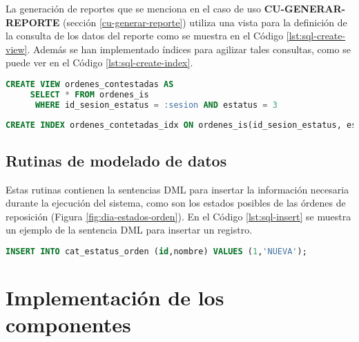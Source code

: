 La generación de reportes que se menciona en el caso de uso \textbf{CU-GENERAR-REPORTE} (sección \ref{cu-generar-reporte}) utiliza una vista para la definición de la consulta de los datos del reporte como se muestra en el Código \ref{lst:sql-create-view}. Además se han implementado índices para agilizar tales consultas, como se puede ver en el Código \ref{lst:sql-create-index}.

\begin{lstlisting}[language=SQL, caption={Sentencia para crear una vista.}, captionpos=b, label={lst:sql-create-view}]
CREATE VIEW ordenes_contestadas AS
     SELECT * FROM ordenes_is
      WHERE id_sesion_estatus = :sesion AND estatus = 3
\end{lstlisting}

\begin{lstlisting}[language=SQL, caption={Sentencia para crear un índice.}, captionpos=b, label={lst:sql-create-index}]
CREATE INDEX ordenes_contetadas_idx ON ordenes_is(id_sesion_estatus, estatus);
\end{lstlisting}

\subsection{Rutinas de modelado de datos}
Estas rutinas contienen la sentencias DML para insertar la información necesaria durante la ejecución del sistema, como son los estados posibles de las órdenes de reposición (Figura \ref{fig:dia-estados-orden}). En el Código \ref{lst:sql-insert} se muestra un ejemplo de la sentencia DML para insertar un registro.

\begin{lstlisting}[language=SQL, caption={Sentencia insertar un registro.}, captionpos=b, label={lst:sql-insert}]
INSERT INTO cat_estatus_orden (id,nombre) VALUES (1,'NUEVA');
\end{lstlisting}

%

\section{Implementación de los componentes}







